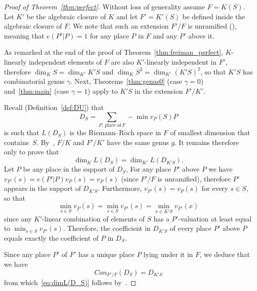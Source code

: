 \documentclass[ALCO,Unicode,ThmDefs]{cedram}
\newcommand*{\MK}{\mkern 2mu}
\begin{document}
\begin{proof}[Proof of Theorem~\ref{thm:perfect}]
Without loss of generality assume $F=K(S)$. Let $K'$ be the algebraic closure of $K$ and let $F'=K'(S)$ be defined inside the algebraic closure of $F$. We note that such an extension $F'/F$ is unramified (\cite[Theorem~III.6.3$\MK$(a)]{Stichtenoth}), meaning that $e(P'|P)=1$ for any place $P$ in $F$ and any $P'$ above it.

As remarked at the end of the proof of Theorem~\ref{thm:freiman_perfect}, $K$-linearly independent elements of $F$ are also $K'$-linearly independent in $F'$, therefore $\dim_KS=\dim_{K'}K'S$ and $\dim_KS^2=\dim_{K'}(K'S)^2$, so that $K'S$ has combinatorial genus $\gamma$. Next, Theorems~\ref{thm:genus0} (case $\gamma=0$) and~\ref{thm:main} (case $\gamma=1$) apply to $K'S$ in the extension $F'/K'$.

Recall (Definition~\ref{def:DU}) that
\[
D_S=\sum_{P,\, \text{place of}\, F}-\min v_P(S)P
\]
is such that $L(D_S)$ is the Riemann--Roch space in $F$ of smallest dimension that contains~$S$. By~\cite[Theorem~III.6.3$\MK$(b)]{Stichtenoth}, $F/K$ and $F'/K'$ have the same genus $g$. It remains therefore only to prove that
\begin{equation}\label{eq:dimL(D_S)}
\dim_KL(D_S)=\dim_{K'}L(D_{K'S}).
\end{equation}
Let $P$ be any place in the support of $D_S$, For any place $P'$ above $P$ we have $v_{P'}(s)= e(P'|P)v_P(s)=v_P(s)$ (since $F'/F$ is unramified), therefore $P'$ appears in the support of $D_{K'S}$. Furthermore, $v_{P'}(s)=v_P(s)$ for every $s\in S$, so that
\[
\min_{s\in S}v_P(s)=\min_{s\in S}v_{P'}(s)=\min_{x\in
K'S}v_{P'}(x)
\]
since any $K'$-linear combination of elements of $S$ has a $P'$-valuation at least equal to $\min_{s\in S}v_{P'}(s)$. Therefore, the coefficient in $D_{K'S}$ of every place $P'$ above $P$ equals exactly the coefficient of $P$ in $D_S$.

Since any place $P'$ of $F'$ has a unique place $P$ lying under it in $F$, we deduce that we have
\[
Con_{F'/F}(D_S)= D_{K'S}
\]
from which~\eqref{eq:dimL(D_S)} follows by~\cite[Theorem~III.6.3$\MK$(d)]{Stichtenoth}.
\end{proof}
\end{document}

